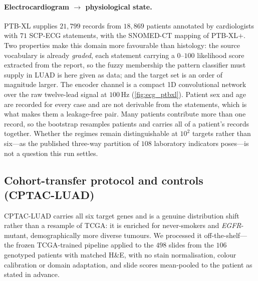 \paragraph{Electrocardiogram $\rightarrow$ physiological state.}
PTB-XL supplies $21{,}799$ records from $18{,}869$ patients annotated by
cardiologists with $71$ SCP-ECG statements, with the SNOMED-CT mapping
of PTB-XL$+$.\cite{wagner2020ptbxl,strodthoff2023ptbxlplus} Two
properties make this domain more favourable than histology: the source
vocabulary is already \emph{graded}, each statement carrying a
$0$--$100$ likelihood score extracted from the report, so the fuzzy
membership the pattern classifier must supply in LUAD is here given as
data; and the target set is an order of magnitude larger. The encoder channel is a compact 1D
convolutional network over the raw twelve-lead signal at $100$\,Hz
(\cref{fig:ecg_ptbxl}).
Patient sex and age are recorded for every case and are not derivable
from the statements, which is what makes them a leakage-free pair. Many
patients contribute more than one record, so the bootstrap resamples
patients and carries all of a patient's records together.
Whether the regimes remain distinguishable at $10^{2}$ targets rather
than six---as the published three-way partition of $108$ laboratory
indicators poses\cite{xiao2025anyecglab}---is not a question this run
settles.

\subsection*{Cohort-transfer protocol and controls (CPTAC-LUAD)}


CPTAC-LUAD carries all six target genes and is a genuine distribution
shift rather than a resample of TCGA: it is enriched for never-smokers
and \textit{EGFR}-mutant, demographically more diverse
tumours.\cite{gillette2020cptacluad,cptacluad_data} We processed it
off-the-shelf---the frozen TCGA-trained pipeline applied to the $498$
slides from the $106$ genotyped patients with matched H\&E, with no stain
normalisation, colour calibration or domain adaptation, and slide scores
mean-pooled to the patient as stated in advance.

